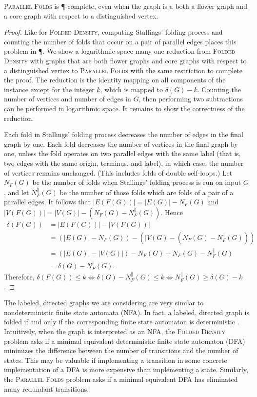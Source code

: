 \documentclass{article}
\newcommand{\FD}{\textsc{Folded Density}}
\newcommand{\PFolds}{\textsc{Parallel Folds}}
\begin{document}
\begin{theorem}
  \PFolds{} is \P-complete, even when the graph is a both a flower graph and a core graph with respect to a distinguished vertex.
\end{theorem}
\begin{proof}
  Like for \FD, computing Stallings' folding process and counting the number of folds that occur on a pair of parallel edges places this problem in \P.
  We show a logarithmic space many-one reduction from \FD{} with graphs that are both flower graphs and core graphs with respect to a distinguished vertex to \PFolds{} with the same restriction to complete the proof.
  The reduction is the identity mapping on all components of the instance except for the integer $k$, which is mapped to $\delta(G) - k$.
  Counting the number of vertices and number of edges in $G$, then performing two subtractions can be performed in logarithmic space.
  It remains to show the correctness of the reduction.

  Each fold in Stallings' folding process decreases the number of edges in the final graph by one.
  Each fold decreases the number of vertices in the final graph by one, unless the fold operates on two parallel edges with the same label (that is, two edges with the same origin, terminus, and label), in which case, the number of vertices remains unchanged.
  (This includes folds of double self-loops.)
  Let $N_F(G)$ be the number of folds when Stallings' folding process is run on input $G$, and let $N^\|_F(G)$ be the number of those folds which are folds of a pair of a parallel edges.
  It follows that $|E(F(G))| = |E(G)| - N_F(G)$ and $|V(F(G))| = |V(G)| - (N_F(G) - N^\|_F(G))$.
  Hence
  \begin{align*}
    \delta(F(G)) & = |E(F(G))| - |V(F(G))| \\
                 & = (|E(G)| - N_F(G)) - (|V(G) - (N_F(G) - N^\|_F(G))) \\
                 & = (|E(G)| - |V(G)|) - N_F(G) + N_F(G) - N^\|_F(G) \\
                 & = \delta(G) - N^\|_F(G).
  \end{align*}
  Therefore, $\delta(F(G)) \leq k \iff \delta(G) - N^\|_F(G) \leq k \iff N^\|_F(G) \geq \delta(G) - k$.
\end{proof}

The labeled, directed graphs we are considering are very similar to nondeterministic finite state automata (NFA).
In fact, a labeled, directed graph is folded if and only if the corresponding finite state automaton is deterministic \cite[Remark~2.8]{km02}.
Intuitively, when the graph is interpreted as an NFA, the \FD{} problem asks if a minimal equivalent deterministic finite state automaton (DFA) minimizes the difference between the number of transitions and the number of states.
This may be valuable if implementing a transition in some concrete implementation of a DFA is more expensive than implementing a state.
Similarly, the \PFolds{} problem asks if a minimal equivalent DFA has eliminated many redundant transitions.
\end{document}
